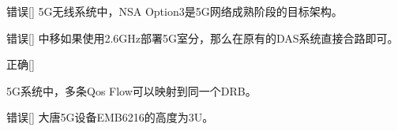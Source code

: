\begin{choice}{\;错误\;}[]
    5G无线系统中，NSA Option3是5G网络成熟阶段的目标架构。

\end{choice}

\begin{choice}{\;错误\;}[]
    中移如果使用2.6GHz部署5G室分，那么在原有的DAS系统直接合路即可。

\end{choice}

\begin{choice}{\;正确\;}[]

    5G系统中，多条Qos Flow可以映射到同一个DRB。
\end{choice}


\begin{choice}{\;错误\;}[]
    大唐5G设备EMB6216的高度为3U。

\end{choice}











